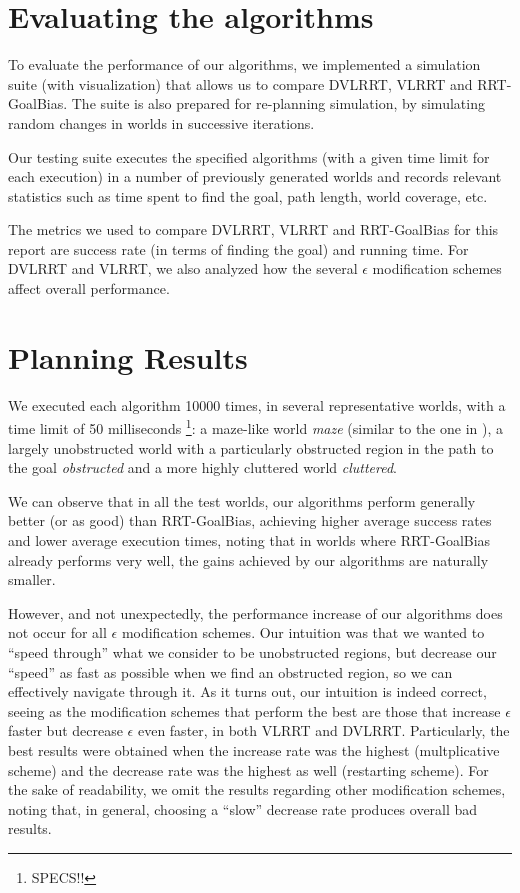 \documentclass[10pt,twoside,twocolumn]{article}
\begin{document}
\section{Evaluating the algorithms}

To evaluate the performance of our algorithms, we implemented a simulation suite (with visualization) that allows
us to compare DVLRRT, VLRRT and RRT-GoalBias. The suite is also prepared for re-planning simulation, by simulating
random changes in worlds in successive iterations.

Our testing suite executes the specified algorithms (with a given time limit for each execution) in a number of previously
generated worlds and records relevant statistics such as time spent to find the goal, path length, world coverage, etc.

The metrics we used to compare DVLRRT, VLRRT and RRT-GoalBias for this report are success rate (in terms of finding the goal) and running
time. For DVLRRT and VLRRT, we also analyzed how the several $\epsilon$ modification schemes affect overall performance.

\section{Planning Results}

We executed each algorithm 10000 times, in several representative worlds, with a time limit of 50 milliseconds \footnote{SPECS!!}: 
a maze-like world \emph{maze} (similar to the one in
\cite{Bruce02real-timerandomized}), a largely unobstructed world with
a particularly obstructed region 
in the path to the goal \emph{obstructed} and a more highly cluttered world \emph{cluttered}.

We can observe that in all the test worlds, our algorithms perform
generally better (or as good) than RRT-GoalBias,
achieving higher average success rates and lower average execution
times, noting that in worlds where RRT-GoalBias already performs
very well, the gains achieved by our algorithms are naturally smaller.

However, and not unexpectedly, the performance increase of our algorithms does not occur for all
$\epsilon$ modification schemes.
Our intuition was that we wanted to ``speed through'' what we consider to be unobstructed regions, but decrease our
``speed'' as fast as possible when we find an obstructed region, so we can effectively navigate through it. As it turns
out, our intuition is indeed correct, seeing as the modification schemes that perform the best are those that
increase $\epsilon$ faster but decrease $\epsilon$ even faster, in both VLRRT and DVLRRT. Particularly, the best
results were obtained when the increase rate was the highest (multplicative scheme) and the decrease rate was the 
highest as well (restarting scheme). For the sake of readability, we
omit the results regarding other modification schemes, noting that, in
general, choosing a ``slow'' decrease rate produces overall bad
results.
\end{document}
